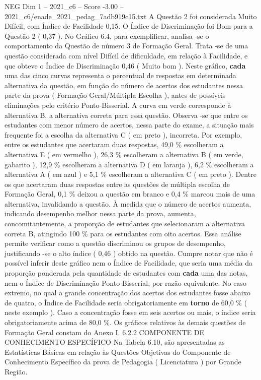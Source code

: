 \begin{textsample}{NEG Dim 1 – 2021\_c6 – Score -3.00 – 2021\_c6/enade\_2021\_pedag\_7adb919c15.txt}
A Questão 2 foi considerada Muito Difícil, com Índice de Facilidade 0,15.
O Índice de Discriminação foi Bom para a Questão 2 ( 0,37 ).
No Gráfico 6.4, para exemplificar, analisa -se o comportamento da Questão de número 3 de Formação Geral.
Trata -se de uma questão considerada com nível Difícil de dificuldade, em relação à Facilidade, e que obteve o Índice de Discriminação 0,46 ( Muito bom ).
Neste gráfico, \textbf{cada} uma das cinco curvas representa o percentual de respostas em determinada alternativa da questão, em função do número de acertos dos estudantes nessa parte da prova ( Formação Geral/Múltipla Escolha ), antes de possíveis eliminações pelo critério Ponto-Bisserial.
A curva em verde corresponde à alternativa B, a alternativa correta para essa questão.
Observa -se que entre os estudantes com menor número de acertos, nessa parte do exame, a situação mais frequente foi a escolha da alternativa C ( em preto ), incorreta.
Por exemplo, entre os estudantes que acertaram duas respostas, 49,0 \% escolheram a alternativa E ( em vermelho ), 26,3 \% escolheram a alternativa B ( em verde, gabarito ), 12,9 \% escolheram a alternativa D ( em laranja ), 6,2 \% escolheram a alternativa A ( em azul ) e 5,1 \% escolheram a alternativa C ( em preto ).
Dentre os que acertaram duas respostas entre as questões de múltipla escolha de Formação Geral, 0,1 \% deixou a questão em branco e 0,4 \% marcou mais de uma alternativa, invalidando a questão.
À medida que o número de acertos aumenta, indicando desempenho melhor nessa parte da prova, aumenta, concomitantemente, a proporção de estudantes que selecionaram a alternativa correta B, atingindo 100 \% para os estudantes com oito acertos.
Essa análise permite verificar como a questão discriminou os grupos de desempenho, justificando -se o alto índice ( 0,46 ) obtido na questão.
Cumpre notar que não é possível inferir deste gráfico nem o Índice de Facilidade, que seria uma média da proporção ponderada pela quantidade de estudantes com \textbf{cada} uma das notas, nem o Índice de Discriminação Ponto-Bisserial, por razão equivalente.
No caso extremo, no qual a grande concentração dos acertos dos estudantes fosse abaixo de quatro, o Índice de Facilidade seria obrigatoriamente em \textbf{torno} de 60,0 \% ( neste exemplo ).
Caso a concentração fosse em seis acertos ou mais, o índice seria obrigatoriamente acima de 80,0 \%.
Os gráficos relativos às demais questões de Formação Geral constam do Anexo I. 6.2.2 COMPONENTE DE CONHECIMENTO ESPECÍFICO Na Tabela 6.10, são apresentadas as Estatísticas Básicas em relação às Questões Objetivas do Componente de Conhecimento Específico da prova de Pedagogia ( Licenciatura ) por Grande Região.

\end{textsample}
